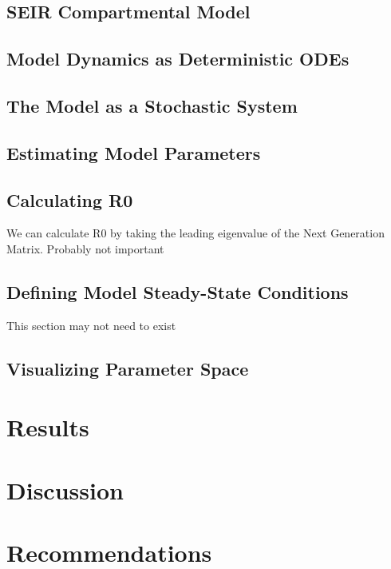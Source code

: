 \documentclass[11pt, a4paper]{article}
\begin{document}
  \subsection{SEIR Compartmental Model}
  
  \subsection{Model Dynamics as Deterministic ODEs}
  
  \subsection{The Model as a Stochastic System}
  
  \subsection{Estimating Model Parameters}
  
  \subsection{Calculating R0}
  We can calculate R0 by taking the leading eigenvalue of the Next Generation Matrix.
  Probably not important
  \clearpage
  \subsection{Defining Model Steady-State Conditions}
  This section may not need to exist
  \clearpage
  \subsection{Visualizing Parameter Space}
  
\section{Results}

\section{Discussion}

\section{Recommendations}

{}

\end{document}
